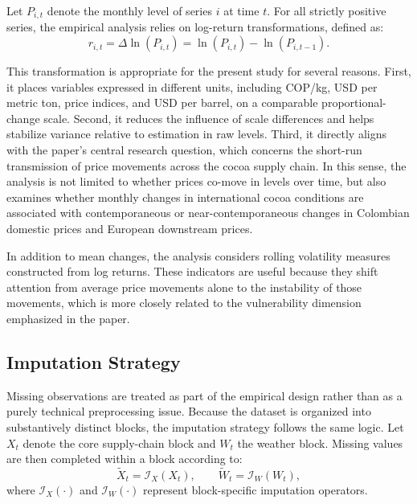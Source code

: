 \documentclass[11pt]{article}
\begin{document}
Let $P_{i,t}$ denote the monthly level of series $i$ at time $t$. For all strictly positive series, the empirical analysis relies on log-return transformations, defined as:
\begin{equation}
r_{i,t} = \Delta \ln(P_{i,t}) = \ln(P_{i,t}) - \ln(P_{i,t-1}).
\label{eq:logreturn}
\end{equation}

This transformation is appropriate for the present study for several reasons. First, it places variables expressed in different units, including COP/kg, USD per metric ton, price indices, and USD per barrel, on a comparable proportional-change scale. Second, it reduces the influence of scale differences and helps stabilize variance relative to estimation in raw levels. Third, it directly aligns with the paper's central research question, which concerns the short-run transmission of price movements across the cocoa supply chain. In this sense, the analysis is not limited to whether prices co-move in levels over time, but also examines whether monthly changes in international cocoa conditions are associated with contemporaneous or near-contemporaneous changes in Colombian domestic prices and European downstream prices.

In addition to mean changes, the analysis considers rolling volatility measures constructed from log returns. These indicators are useful because they shift attention from average price movements alone to the instability of those movements, which is more closely related to the vulnerability dimension emphasized in the paper.

\subsection{Imputation Strategy}

Missing observations are treated as part of the empirical design rather than as a purely technical preprocessing issue. Because the dataset is organized into substantively distinct blocks, the imputation strategy follows the same logic. Let $X_t$ denote the core supply-chain block and $W_t$ the weather block. Missing values are then completed within a block according to:
\begin{equation}
\tilde{X}_t = \mathcal{I}_{X}(X_t), \qquad \tilde{W}_t = \mathcal{I}_{W}(W_t),
\label{eq:block_imputation}
\end{equation}
where $\mathcal{I}_{X}(\cdot)$ and $\mathcal{I}_{W}(\cdot)$ represent block-specific imputation operators.
\end{document}
